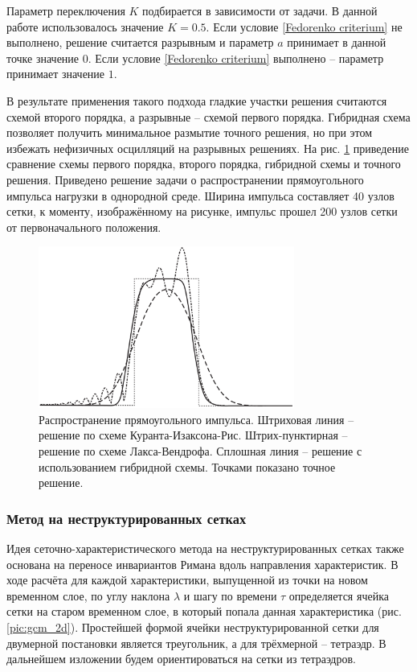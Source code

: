 Параметр переключения $K$ подбирается в зависимости от задачи. В данной работе использовалось значение $K = 0.5$. Если условие \ref{Fedorenko criterium} не выполнено, решение считается разрывным и параметр $a$ принимает в данной точке значение $0$. Если условие \ref{Fedorenko criterium} выполнено -- параметр принимает значение $1$.

В результате применения такого подхода гладкие участки решения считаются схемой второго порядка, а разрывные -- схемой первого порядка. Гибридная схема позволяет получить минимальное размытие точного решения, но при этом избежать нефизичных осцилляций на разрывных решениях. На рис. \ref{pic:hybrid-scheme-testing} приведение сравнение схемы первого порядка, второго порядка, гибридной схемы и точного решения. Приведено решение задачи о распространении прямоугольного импульса нагрузки в однородной среде. Ширина импульса составляет 40 узлов сетки, к моменту, изображённому на рисунке, импульс прошел 200 узлов сетки от первоначального положения.

\begin{figure}[h]
\centerline{\includegraphics[width=0.75\textwidth]{png/hybrid-scheme-testing.png}}
\caption{Распространение прямоугольного импульса. Штриховая линия -- решение по схеме Куранта-Изаксона-Рис. Штрих-пунктирная -- решение по схеме Лакса-Вендрофа. Сплошная линия -- решение с использованием гибридной схемы. Точками показано точное решение.}
\label{pic:hybrid-scheme-testing}
\end{figure}

\subsubsection{Метод на неструктурированных сетках}

Идея сеточно-характеристического метода на неструктурированных сетках также основана на переносе инвариантов Римана вдоль направления характеристик. В ходе расчёта для каждой характеристики, выпущенной из точки на новом временном слое, по углу наклона $\lambda$ и шагу по времени $\tau$ определяется ячейка сетки на старом временном слое, в который попала данная характеристика (рис. \ref{pic:gcm_2d}). Простейшей формой ячейки неструктурированной сетки для двумерной постановки является треугольник, а для трёхмерной -- тетраэдр. В дальнейшем изложении будем ориентироваться на сетки из тетраэдров.

